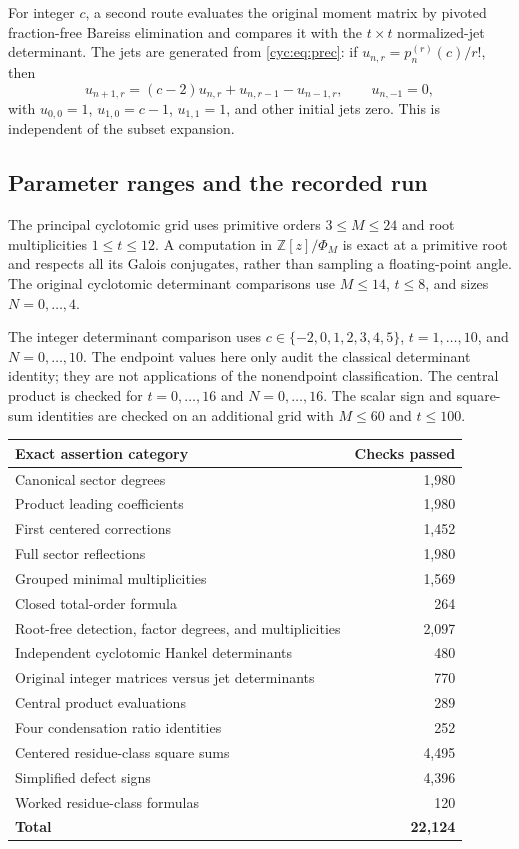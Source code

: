 \documentclass[11pt,a4paper]{article}
\numberwithin{equation}{section}
\theoremstyle{definition}
\theoremstyle{remark}
\newcommand{\ZZ}{\mathbb Z}
\begin{document}
For integer $c$, a second route evaluates the original moment matrix
by pivoted fraction-free Bareiss elimination and compares it with the
$t\times t$ normalized-jet determinant.  The jets are generated from
\eqref{cyc:eq:prec}: if $u_{n,r}=p_n^{(r)}(c)/r!$, then
\begin{equation}\label{cyc:eq:jetcode}
 u_{n+1,r}=(c-2)u_{n,r}+u_{n,r-1}-u_{n-1,r},\qquad u_{n,-1}=0,
\end{equation}
with $u_{0,0}=1$, $u_{1,0}=c-1$, $u_{1,1}=1$, and other initial
jets zero.  This is independent of the subset expansion.

\subsection{Parameter ranges and the recorded run}
The principal cyclotomic grid uses primitive orders $3\le M\le24$
and root multiplicities $1\le t\le12$.  A computation in
$\ZZ[z]/\Phi_M$ is exact at a primitive root and respects all its
Galois conjugates, rather than sampling a floating-point angle.
The original cyclotomic determinant comparisons use $M\le14$,
$t\le8$, and sizes $N=0,\ldots,4$.

The integer determinant comparison uses
$c\in\{-2,0,1,2,3,4,5\}$, $t=1,\ldots,10$, and $N=0,\ldots,10$.
The endpoint values here only audit the classical determinant identity;
they are not applications of the nonendpoint classification.
The central product is checked for $t=0,\ldots,16$ and
$N=0,\ldots,16$.  The scalar sign and square-sum identities are checked
on an additional grid with $M\le60$ and $t\le100$.

\begin{center}
\renewcommand{\arraystretch}{1.08}
\begin{tabular}{@{}lr@{}}
\toprule
Exact assertion category&Checks passed\\
\midrule
Canonical sector degrees&1,980\\
Product leading coefficients&1,980\\
First centered corrections&1,452\\
Full sector reflections&1,980\\
Grouped minimal multiplicities&1,569\\
Closed total-order formula&264\\
Root-free detection, factor degrees, and multiplicities&2,097\\
Independent cyclotomic Hankel determinants&480\\
Original integer matrices versus jet determinants&770\\
Central product evaluations&289\\
Four condensation ratio identities&252\\
Centered residue-class square sums&4,495\\
Simplified defect signs&4,396\\
Worked residue-class formulas&120\\
\midrule
\textbf{Total}&\textbf{22,124}\\
\bottomrule
\end{tabular}
\end{center}
\end{document}
